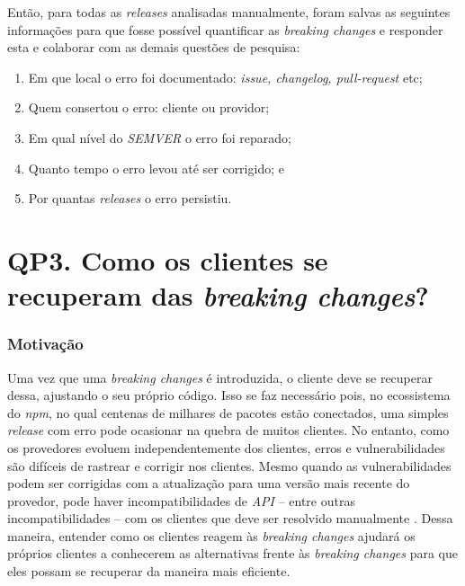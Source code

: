 Então, para todas as \textit{releases} analisadas manualmente, foram salvas as seguintes informações para que fosse possível quantificar as \textit{breaking changes} e responder esta e colaborar com as demais questões de pesquisa:

\begin{enumerate}
    \item Em que local o erro foi documentado: \textit{issue, changelog, pull-request} etc;
    \item Quem consertou o erro: cliente ou providor;
    \item Em qual nível do \textit{SEMVER} o erro foi reparado;
    \item Quanto tempo o erro levou até ser corrigido; e
    \item Por quantas \textit{releases} o erro persistiu.
\end{enumerate}{}


\section{QP3. Como os clientes se recuperam das \textit{breaking changes}?}
\label{sec:qp3}

\subsubsection{Motivação}
\label{sec:qp3:motivation}

Uma vez que uma \textit{breaking changes} é introduzida, o cliente deve se recuperar dessa, ajustando o seu próprio código. Isso se faz necessário pois, no ecossistema do  \textit{npm}, no qual centenas de milhares de pacotes estão conectados, uma simples \textit{release} com erro pode ocasionar na quebra de muitos clientes. No entanto, como os provedores evoluem independentemente dos clientes, erros e vulnerabilidades são difíceis de rastrear e corrigir nos clientes. Mesmo quando as vulnerabilidades podem ser corrigidas com a atualização para uma versão mais recente do provedor, pode haver incompatibilidades de \textit{API} -- entre outras incompatibilidades -- com os clientes que deve ser resolvido manualmente \cite{Foo:2018:ESC:3236024.3275535}. Dessa maneira, entender como os clientes reagem às \textit{breaking changes} ajudará os próprios clientes a conhecerem as alternativas frente às \textit{breaking changes} para que eles possam se recuperar da maneira mais eficiente.

